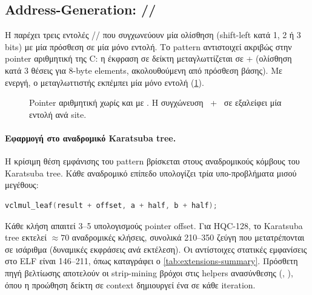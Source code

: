 \subsection{ Address-Generation: //}
\label{ssec:zba-address-gen}

Η  παρέχει τρεις εντολές //
που συγχωνεύουν μία ολίσθηση (shift-left κατά 1, 2 ή 3 bits) με μία
πρόσθεση σε μία μόνο εντολή. Το pattern αντιστοιχεί ακριβώς στην pointer
αριθμητική της C: η έκφραση  σε δείκτη 
μεταγλωττίζεται σε  + 
(ολίσθηση κατά 3 θέσεις για 8-byte elements, ακολουθούμενη από πρόσθεση
βάσης). Με  ενεργή, ο μεταγλωττιστής εκπέμπει μία μόνο εντολή
 (\cref{fig:zba-disasm}).

\begin{figure}[htbp]
  
  \caption{Pointer αριθμητική  χωρίς και με .
           Η συγχώνευση ~+~ σε 
           εξαλείφει μία εντολή ανά site.}
  \label{fig:zba-disasm}
\end{figure}

\paragraph{Εφαρμογή στο αναδρομικό Karatsuba tree.}
Η κρίσιμη θέση εμφάνισης του pattern βρίσκεται στους αναδρομικούς κόμβους
του Karatsuba tree. Κάθε αναδρομικό επίπεδο υπολογίζει τρία
υπο-προβλήματα μισού μεγέθους:
%
\begin{lstlisting}[language=C, basicstyle=\small\ttfamily]
vclmul_leaf(result + offset, a + half, b + half);
\end{lstlisting}
%
Κάθε κλήση απαιτεί \num{3}–\num{5} υπολογισμούς pointer offset.
Για HQC-128, το Karatsuba tree εκτελεί $\approx\num{70}$ αναδρομικές
κλήσεις, συνολικά \num{210}–\num{350} ζεύγη  που
μετατρέπονται σε ισάριθμα  (δυναμικές εκφράσεις ανά εκτέλεση). Οι αντίστοιχες στατικές εμφανίσεις στο ELF είναι \num{146}–\num{211}, όπως καταγράφει ο \cref{tab:extensions-summary}. Πρόσθετη πηγή βελτίωσης
αποτελούν οι \RVV strip-mining βρόχοι στις helpers ανασύνθεσης
(, ), όπου η προώθηση
δείκτη  σε  context δημιουργεί ένα
 σε κάθε iteration.

